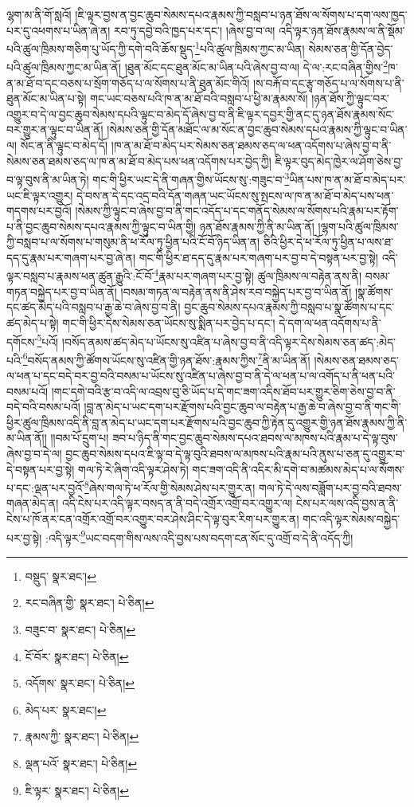 ལྷག་མ་ནི་གོ་སླའོ། །ཇི་ལྟར་བྱས་ན་བྱང་ཆུབ་སེམས་དཔའ་རྣམས་ཀྱི་བསླབ་པ་ཉན་ཐོས་ལ་སོགས་པ་དག་ལས་ཁྱད་པར་དུ་འཕགས་པ་ཡིན་ཞེ་ན། རབ་ཏུ་དབྱེ་བའི་ཁྱད་པར་དང་། །ཞེས་བྱ་བ་ལ། འདི་ལྟར་ཉན་ཐོས་རྣམས་ལ་ནི་སྡོམ་པའི་ཚུལ་ཁྲིམས་གཅིག་པུ་ཡོད་ཀྱི་དགེ་བའི་ཆོས་སྡུད་\footnote{བསྡུད་  སྣར་ཐང་། }པའི་ཚུལ་ཁྲིམས་ཀྱང་མ་ཡིན། སེམས་ཅན་གྱི་དོན་བྱེད་པའི་ཚུལ་ཁྲིམས་ཀྱང་མ་ཡིན་ནོ། །ཐུན་མོང་དང་ཐུན་མོང་མ་ཡིན་པའི་ཞེས་བྱ་བ་ལ། དེ་ལ་:རང་བཞིན་གྱིས་\footnote{རང་བཞིན་གྱི་  སྣར་ཐང་།  པེ་ཅིན། }ཁ་ན་མ་ཐོ་བ་དང་བཅས་པ་སྲོག་གཅོད་པ་ལ་སོགས་པ་ནི་ཐུན་མོང་གིའོ། །ས་བརྐོ་བ་དང་རྩྭ་གཅོད་པ་ལ་སོགས་པ་ནི་ཐུན་མོང་མ་ཡིན་པ་སྟེ། གང་ཡང་བཅས་པའི་ཁ་ན་མ་ཐོ་བའི་བསླབ་པ་ཕྱི་མ་རྣམས་སོ། །ཉན་ཐོས་ཀྱི་ལྟུང་བར་འགྱུར་བ་དེ་ལ་བྱང་ཆུབ་སེམས་དཔའི་ལྟུང་བ་མེད་དོ་ཞེས་བྱ་བ་ནི་ཇི་ལྟར་དབྱར་གྱི་ནང་དུ་ཉན་ཐོས་རྣམས་སོང་བར་གྱུར་ན་ལྟུང་བ་ཡིན་ནོ། །སེམས་ཅན་གྱི་དོན་མཐོང་ལ་མ་སོང་ན་བྱང་ཆུབ་སེམས་དཔའ་རྣམས་ཀྱི་ལྟུང་བ་ཡིན་ལ། སོང་ན་ནི་ལྟུང་བ་མེད་དོ། །ཁ་ན་མ་ཐོ་བ་མེད་པར་སེམས་ཅན་ཐམས་ཅད་ལ་ཕན་འདོགས་པ་ཞེས་བྱ་བ་ནི་སེམས་ཅན་ཐམས་ཅད་ལ་ཁ་ན་མ་ཐོ་བ་མེད་པས་ཕན་འདོགས་པར་བྱེད་ཀྱི། ཇི་ལྟར་བུད་མེད་ཁྱེར་ལ་ཤོག་ཅེས་བྱ་བ་ལྟ་བུས་ནི་མ་ཡིན་ཏེ། གང་གི་ཕྱིར་ཡང་དེ་ནི་གཞན་གྱིས་ཡོངས་སུ་:གཟུང་བ་\footnote{བཟུང་བ་  སྣར་ཐང་།  པེ་ཅིན། }ཡིན་པས་ཁ་ན་མ་ཐོ་བ་མེད་པར་ཡང་ཇི་ལྟར་འགྱུར། དེ་བས་ན་དེ་དང་འདྲ་བའི་དོན་གཞན་ཡང་ཡོངས་སུ་སྤངས་ལ་ཁ་ན་མ་ཐོ་བ་མེད་པས་ཕན་གདགས་པར་བྱའོ། །སེམས་ཀྱི་ལྟུང་བ་ཞེས་བྱ་བ་ནི་གང་འདོད་པ་དང་གནོད་སེམས་ལ་སོགས་པའི་རྣམ་པར་རྟོག་པ་ནི་བྱང་ཆུབ་སེམས་དཔའ་རྣམས་ཀྱི་ལྟུང་བ་ཡིན་གྱི། ཉན་ཐོས་རྣམས་ཀྱི་ནི་མ་ཡིན་ནོ། །ལྷག་པའི་ཚུལ་ཁྲིམས་ཀྱི་བསླབ་པ་ལ་སོགས་པ་གསུམ་ནི་ཕ་རོལ་ཏུ་ཕྱིན་པའི་ངོ་བོ་ཉིད་ཡིན་ན། ཅིའི་ཕྱིར་དེ་ཕ་རོལ་ཏུ་ཕྱིན་པ་ལས་ཐ་དད་དུ་རྣམ་པར་གཞག་པར་བྱ་ཞེ་ན། གང་གི་ཕྱིར་ཐ་དད་དུ་རྣམ་པར་གཞག་པར་བྱ་བ་དེ་བསྟན་པར་བྱ་སྟེ། འདི་ལྟར་བསླབ་པ་རྣམས་ཕན་ཚུན་རྒྱུའི་:ངོ་བོ་\footnote{ངོ་བོར་  སྣར་ཐང་།  པེ་ཅིན། }རྣམ་པར་གཞག་པར་བྱ་སྟེ། ཚུལ་ཁྲིམས་ལ་བརྟེན་ནས་ནི། བསམ་གཏན་བསྐྱེད་པར་བྱ་བ་ཡིན་ནོ། །བསམ་གཏན་ལ་བརྟེན་ནས་ནི་ཤེས་རབ་བསྐྱེད་པར་བྱ་བ་ཡིན་ནོ། །སྣ་ཚོགས་དང་ཚད་མེད་པའི་བསླབ་པ་རྒྱ་ཆེ་བ་ཞེས་བྱ་བ་ནི། བྱང་ཆུབ་སེམས་དཔའ་རྣམས་ཀྱི་བསླབ་པ་སྣ་ཚོགས་པ་དང་ཚད་མེད་པ་སྟེ། གང་གི་ཕྱིར་དེས་སེམས་ཅན་ཡོངས་སུ་སྨིན་པར་བྱེད་པ་དང་། དེ་དག་ལ་ཕན་འདོགས་པ་ནི་དགོངས་\footnote{འདོགས་  སྣར་ཐང་།  པེ་ཅིན། }པའོ། །བསོད་ནམས་ཚད་མེད་པ་ཡོངས་སུ་འཛིན་པ་ཞེས་བྱ་བ་ནི་འདི་ལྟར་དེས་སེམས་ཅན་ཚད་:མེད་པའི་\footnote{མེད་པར་  སྣར་ཐང་། }བསོད་ནམས་ཀྱི་ཚོགས་ཡོངས་སུ་འཛིན་གྱི་ཉན་ཐོས་:རྣམས་ཀྱིས་\footnote{རྣམས་ཀྱི་  སྣར་ཐང་།  པེ་ཅིན། }ནི་མ་ཡིན་ནོ། །སེམས་ཅན་ཐམས་ཅད་ལ་ཕན་པ་དང་བདེ་བར་བྱ་བའི་བསམ་པ་ཡོངས་སུ་འཛིན་པ་ཞེས་བྱ་བ་ནི་དེ་ལ་ཕན་པ་ལ་འགོད་པ་ནི་ཕན་པའི་བསམ་པའོ། །གང་དགེ་བའི་རྩ་བ་འདི་ལ་འབྲས་བུ་ཅི་ཡོད་པ་དེ་གང་ཟག་འདིས་ཐོབ་པར་གྱུར་ཅིག་ཅེས་བྱ་བ་ནི་བདེ་བའི་བསམ་པའོ། །བླ་ན་མེད་པ་ཡང་དག་པར་རྫོགས་པའི་བྱང་ཆུབ་ལ་བརྟེན་པ་རྒྱ་ཆེ་བ་ཞེས་བྱ་བ་ནི་གང་གི་ཕྱིར་ཚུལ་ཁྲིམས་འདི་ནི་བླ་ན་མེད་པ་ཡང་དག་པར་རྫོགས་པའི་བྱང་ཆུབ་ཀྱི་རྟེན་དུ་འགྱུར་གྱི་ཉན་ཐོས་རྣམས་ཀྱི་ནི་མ་ཡིན་ནོ།། །།བམ་པོ་དྲུག་པ། ཟབ་པ་ཉིད་ནི་གང་བྱང་ཆུབ་སེམས་དཔའ་ཐབས་ལ་མཁས་པའི་རྣམ་པ་དེ་ལྟ་བུས་ཞེས་བྱ་བ་དེ་ལ། བྱང་ཆུབ་སེམས་དཔའ་ཇི་ལྟ་བ་དེ་ལྟ་བུའི་ཐབས་ལ་མཁས་པའི་རྣམ་པའི་ནུས་པ་ཅན་དུ་འགྱུར་བ་དེ་བསྟན་པར་བྱ་སྟེ། གལ་ཏེ་རེ་ཞིག་འདི་ལྟར་ཤེས་ཏེ། གང་ཟག་འདི་ནི་འདིར་མི་དགེ་བ་མཚམས་མེད་པ་ལ་སོགས་པ་དང་:ལྡན་པར་བྱའོ་\footnote{ལྡན་པའོ་  སྣར་ཐང་།  པེ་ཅིན། }ཞེས་གལ་ཏེ་ཕ་རོལ་གྱི་སེམས་ཤེས་པར་གྱུར་ན། གལ་ཏེ་དེ་ལས་བཟློག་པར་བྱ་བའི་ཐབས་གཞན་མེད་ན། འདི་ངེས་པར་འདི་ལྟར་བསད་ན་ནི་བདེ་འགྲོར་འགྲོ་བར་འགྱུར་ལ། ངེས་པར་ལས་འདི་བྱས་ན་ནི་ངེས་པ་ཁོ་ནར་ངན་འགྲོར་འགྲོ་བར་འགྱུར་བར་ཤེས་ཤིང་དེ་ལྟ་བུར་རིག་པར་གྱུར་ན། གང་འདི་ལྟར་སེམས་བསྐྱེད་པར་བྱ་སྟེ། :འདི་ལྟར་\footnote{ཇི་ལྟར་  སྣར་ཐང་།  པེ་ཅིན། }ཡང་བདག་གིས་ལས་འདི་བྱས་པས་བདག་ངན་སོང་དུ་འགྲོ་བ་དེ་ནི་འདོད་ཀྱི། 